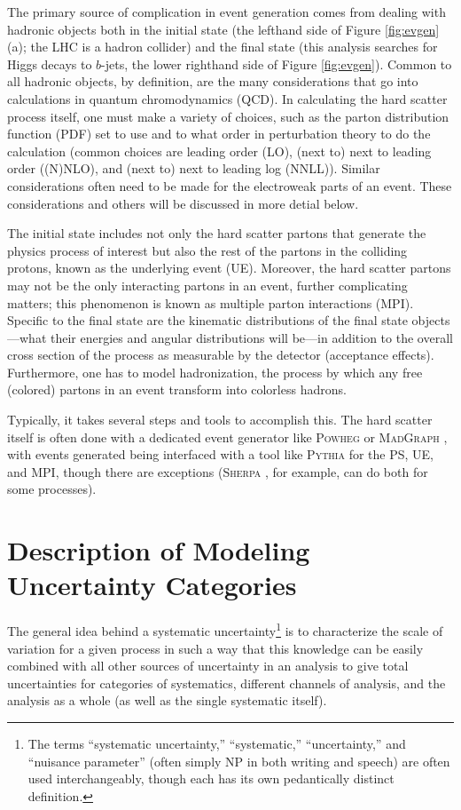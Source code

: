 The primary source of complication in event generation comes from dealing with hadronic objects both in the initial state (the lefthand side of Figure \ref{fig:evgen} (a); the LHC is a hadron collider) and the final state (this analysis searches for Higgs decays to $b$-jets, the lower righthand side of Figure \ref{fig:evgen}).  Common to all hadronic objects, by definition, are the many considerations that go into calculations in quantum chromodynamics (QCD).  In calculating the hard scatter process itself, one must make a variety of choices, such as the parton distribution function (PDF) set to use and to what order in perturbation theory to do the calculation (common choices are leading order (LO), (next to) next to leading order ((N)NLO), and (next to) next to leading log (NNLL)).  Similar considerations often need to be made for the electroweak parts of an event.  These considerations and others will be discussed in more detial below.  

The initial state includes not only the hard scatter partons that generate the physics process of interest but also the rest of the partons in the colliding protons, known as the underlying event (UE).  Moreover, the hard scatter partons may not be the only interacting partons in an event, further complicating matters; this phenomenon is known as multiple parton interactions (MPI).  Specific to the final state are the kinematic distributions of the final state objects---what their energies and angular distributions will be---in addition to the overall cross section of the process as measurable by the detector (acceptance effects).  Furthermore, one has to model hadronization, the process by which any free (colored) partons in an event transform into colorless hadrons.

Typically, it takes several steps and tools to accomplish this.  The hard scatter itself is often done with a dedicated event generator like \textsc{Powheg} \cite{powheg0} or \textsc{MadGraph} \cite{madgraph}, with events generated being interfaced with a tool like \textsc{Pythia} \cite{pythia8} for the PS, UE, and MPI, though there are exceptions (\textsc{Sherpa} \cite{sherpa}, for example, can do both for some processes).

\section{Description of Modeling Uncertainty Categories}
\label{sec:modsysgen}
The general idea behind a systematic uncertainty\footnote{The terms ``systematic uncertainty,'' ``systematic,'' ``uncertainty,'' and ``nuisance parameter'' (often simply NP in both writing and speech) are often used interchangeably, though each has its own pedantically distinct definition.}  is to characterize the scale of variation for a given process in such a way that this knowledge can be easily combined with all other sources of uncertainty in an analysis to give total uncertainties for categories of systematics, different channels of analysis, and the analysis as a whole (as well as the single systematic itself).

